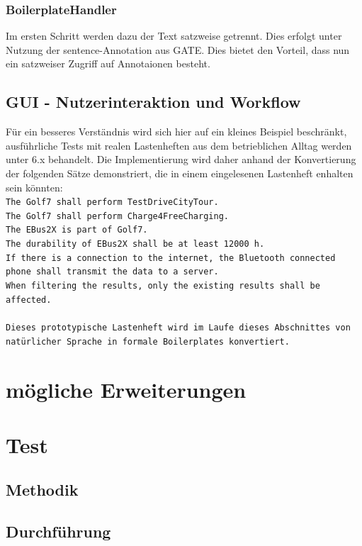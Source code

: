 \documentclass[12pt]{report}
\begin{document}
\subsubsection{BoilerplateHandler}
Im ersten Schritt werden dazu der Text satzweise getrennt. Dies erfolgt unter Nutzung der sentence-Annotation aus GATE. Dies bietet den Vorteil, dass nun ein satzweiser Zugriff auf Annotaionen besteht.
\subsection{GUI - Nutzerinteraktion und Workflow}
Für ein besseres Verständnis wird sich hier auf ein kleines Beispiel beschränkt, ausführliche Tests mit realen Lastenheften aus dem betrieblichen Alltag werden unter 6.x behandelt. Die Implementierung wird daher anhand der Konvertierung der folgenden Sätze demonstriert, die in einem eingelesenen Lastenheft enhalten sein könnten:
\tt \\
The Golf7 shall perform TestDriveCityTour.\\

The Golf7 shall perform Charge4FreeCharging.\\

The EBus2X is part of Golf7.\\

The durability of EBus2X shall be at least 12000 h.\\

If there is a connection to the internet, the Bluetooth connected phone shall transmit the data to a server.\\

When filtering the results, only the existing results shall be affected.\\
\\ \rm
Dieses prototypische Lastenheft wird im Laufe dieses Abschnittes von natürlicher Sprache in formale Boilerplates konvertiert. 
\section{mögliche Erweiterungen}
\section{Test}
\subsection{Methodik}
\subsection{Durchführung}
\end{document}

